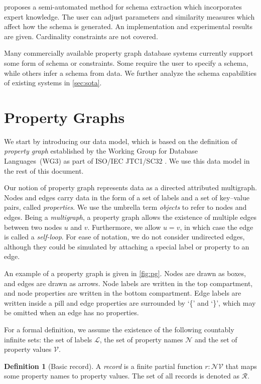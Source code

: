 \documentclass{article}
\makeatletter
\theoremstyle{definition}
\newtheorem{definition}{Definition}
\newcommand{\pto}{}%
\DeclareRobustCommand{\pto}{\mathrel{\mathpalette\p@to@gets\to}}
\newcommand{\p@to@gets}[2]{%
  \ooalign{\hidewidth$\m@th#1\mapstochar\mkern5mu$\hidewidth\cr$\m@th#1\to$\cr}%
}
\makeatother
\begin{document}
\citet{lei2021thesis} proposes a semi-automated method for schema extraction which incorporates expert knowledge. The user can adjust parameters and similarity measures which affect how the schema is generated. An implementation and experimental results are given. Cardinality constraints are not covered.

Many commercially available property graph database systems currently support some form of schema or constraints. Some require the user to specify a schema, while others infer a schema from data. We further analyze the schema capabilities of existing systems in \autoref{sec:sota}.

\section{Property Graphs}

We start by introducing our data model, which is based on the definition of \emph{property graph} established by the Working Group for Database Languages~(WG3) as part of ISO/IEC JTC1/SC32 \citep{deutsch2021gpml}. We use this data model in the rest of this document.

Our notion of property graph represents data as a directed attributed multigraph. Nodes and edges carry data in the form of a set of labels and a set of key--value pairs, called \emph{properties}. We use the umbrella term \emph{objects} to refer to nodes and edges. Being a \emph{multigraph}, a property graph allows the existence of multiple edges between two nodes $u$ and $v$. Furthermore, we allow $u = v$, in which case the edge is called a \emph{self-loop}. For ease of notation, we do not consider undirected edges, although they could be simulated by attaching a special label or property to an edge.

An example of a property graph is given in \autoref{fig:pg}. Nodes are drawn as boxes, and edges are drawn as arrows. Node labels are written in the top compartment, and node properties are written in the bottom compartment. Edge labels are written inside a pill and edge properties are surrounded by `\{' and `\}', which may be omitted when an edge has no properties.

For a formal definition, we assume the existence of the following countably infinite sets: the set of labels $\mathcal{L}$, the set of property names $\mathcal{N}$ and the set of property values $\mathcal{V}$.

\begin{definition}[Basic record]
  \label{def:record-basic}
  A \emph{record} is a finite partial function $r : \mathcal{N} \pto \mathcal{V}$ that maps some property names to property values. The set of all records is denoted as $\mathcal{R}$.
\end{definition}
\end{document}
